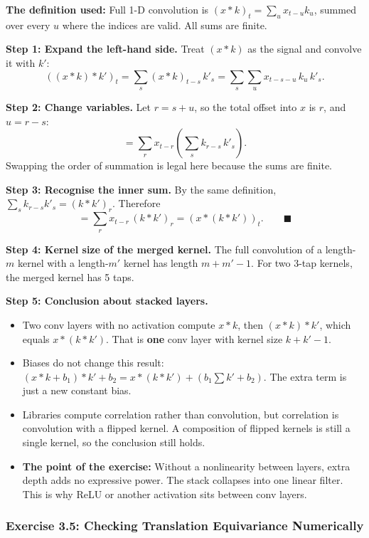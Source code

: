 \textbf{The definition used:} Full 1-D convolution is $(x * k)_t = \sum_u x_{t-u} k_u$, summed over every $u$ where the indices are valid. All sums are finite.

\textbf{Step 1: Expand the left-hand side.}
Treat $(x * k)$ as the signal and convolve it with $k'$:
\[
((x * k) * k')_t = \sum_s (x * k)_{t-s}\, k'_s = \sum_s \sum_u x_{t-s-u}\, k_u\, k'_s.
\]

\textbf{Step 2: Change variables.}
Let $r = s + u$, so the total offset into $x$ is $r$, and $u = r - s$:
\[
= \sum_r x_{t-r} \left( \sum_s k_{r-s}\, k'_s \right).
\]
Swapping the order of summation is legal here because the sums are finite.

\textbf{Step 3: Recognise the inner sum.}
By the same definition, $\sum_s k_{r-s} k'_s = (k * k')_r$. Therefore
\[
= \sum_r x_{t-r}\, (k * k')_r = (x * (k * k'))_t. \qquad \blacksquare
\]

\textbf{Step 4: Kernel size of the merged kernel.}
The full convolution of a length-$m$ kernel with a length-$m'$ kernel has length $m + m' - 1$. For two 3-tap kernels, the merged kernel has 5 taps.

\textbf{Step 5: Conclusion about stacked layers.}
\begin{itemize}
  \item Two conv layers with no activation compute $x * k$, then $(x * k) * k'$, which equals $x * (k * k')$. That is \textbf{one} conv layer with kernel size $k + k' - 1$.
  \item Biases do not change this result: $(x * k + b_1) * k' + b_2 = x * (k * k') + (b_1 \textstyle\sum k' + b_2)$. The extra term is just a new constant bias.
  \item Libraries compute correlation rather than convolution, but correlation is convolution with a flipped kernel. A composition of flipped kernels is still a single kernel, so the conclusion still holds.
  \item \textbf{The point of the exercise:} Without a nonlinearity between layers, extra depth adds no expressive power. The stack collapses into one linear filter. This is why ReLU or another activation sits between conv layers.
\end{itemize}

\subsubsection*{Exercise 3.5: Checking Translation Equivariance Numerically}

